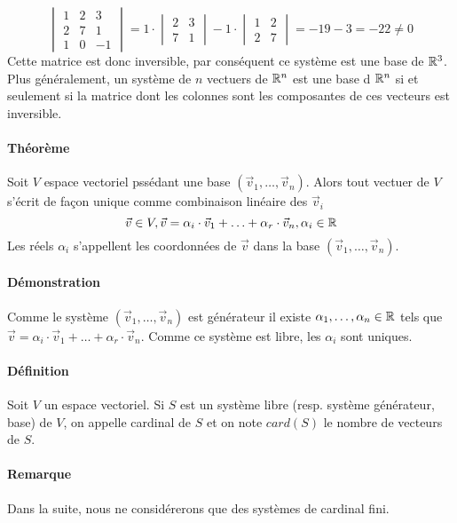 $$\begin{vmatrix}
  1 & 2 & 3 \\
  2 & 7 & 1 \\
  1 & 0 & -1
\end{vmatrix}
=
1 \cdot 
\begin{vmatrix}
  2 & 3 \\
  7 & 1
\end{vmatrix}
-1 \cdot
\begin{vmatrix}
  1 & 2 \\
  2 & 7
\end{vmatrix}
= -19 -3 = -22 \neq 0$$
Cette matrice est donc inversible, par conséquent ce système est une base de $\mathbb{R}^3$. \\
Plus généralement, un système de $n$ vectuers de $\mathbb{R}^n$ est une base d $\mathbb{R}^n$ si et seulement si la matrice dont les colonnes sont les composantes de ces vecteurs est inversible.

\paragraph{Théorème} Soit $V$ espace vectoriel pssédant une base $(\vec{v}_1, \ldots, \vec{v}_n)$. Alors tout vectuer de $V$ s'écrit de façon unique comme combinaison linéaire des $\vec{v}_i$
$$\vec{v} \in V, \vec{v}=\alpha_i \cdot \vec{v}_1 + \ldots + \alpha_r \cdot \vec{v}_n, \alpha_i \in \mathbb{R}$$
Les réels $\alpha_i$ s'appellent les coordonnées de $\vec{v}$ dans la base $(\vec{v}_1, \ldots, \vec{v}_n)$.
\paragraph{Démonstration} Comme le système $(\vec{v}_1, \ldots, \vec{v}_n)$ est générateur il existe  $\alpha_1, \ldots, \alpha_n \in \mathbb{R}$ tels que $\vec{v}=\alpha_i \cdot \vec{v}_1 + \ldots + \alpha_r \cdot \vec{v}_n$. Comme ce système est libre, les $\alpha_i$ sont uniques.

\paragraph{Définition} Soit $V$ un espace vectoriel. Si $S$ est un système libre (resp. système générateur, base) de $V$, on appelle cardinal de $S$ et on note $card(S)$ le nombre de vecteurs de $S$.

\paragraph{Remarque} Dans la suite, nous ne considérerons que des systèmes de cardinal fini.

